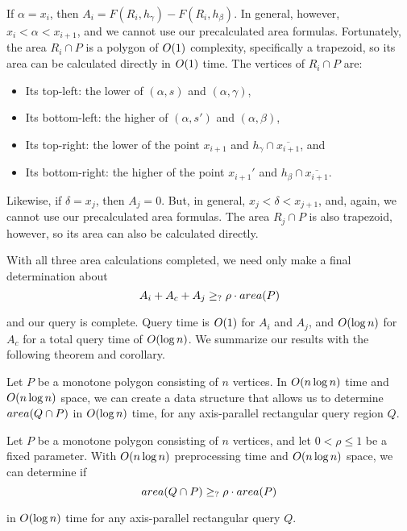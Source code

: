 If $\alpha = x_i$, then $A_i = F(R_i, h_\gamma) - F(R_i, h_\beta)$. In general, however, $x_i < \alpha < x_{i+1}$, and we cannot use our precalculated area formulas. Fortunately, the area $R_i \cap P$ is a polygon of $O\!\left(1\right)$ complexity, specifically a trapezoid, so its area can be calculated directly in $O\!\left(1\right)$ time. The vertices of $R_i \cap P$ are:
\begin{itemize}
 \item Its top-left: the lower of $(\alpha, s)$ and $(\alpha, \gamma)$,

 \item Its bottom-left: the higher of $(\alpha, s')$ and $(\alpha, \beta)$,

 \item Its top-right: the lower of the point $x_{i+1}$ and  $h_\gamma \cap \overline{x_{i+1}}$, and

 \item Its bottom-right: the higher of the point $x_{i+1}'$ and $h_\beta \cap \overline{x_{i+1}}$.

\end{itemize}

Likewise, if $\delta = x_j$, then $A_j = 0$. But, in general, $x_j < \delta < x_{j+1}$, and, again, we cannot use our precalculated area formulas. The area $R_j \cap P$ is also trapezoid, however, so its area can also be calculated directly.

With all three area calculations completed, we need only make a final determination about 
\[
A_i + A_c + A_j \geq_? \rho \cdot area(P)
\]

\noindent 
and our query is complete. Query time is $O\!\left(1\right)$ for $A_i$ and $A_j$, and $O\!\left(\log{n}\right)$ for $A_c$ for a total query time of $O\!\left(\log{n}\right)$. We summarize our results with the following theorem and corollary.

\begin{theorem}
\label{th:monotonep:rect:area}
Let $P$ be a monotone polygon consisting of $n$ vertices. In $O\!\left(n \log{n}\right)$ time and $O\!\left(n \log{n}\right)$ space, we can create a data structure that allows us to determine $area(Q \cap P)$ in $O\!\left(\log{n}\right)$ time, for any axis-parallel rectangular query region $Q$.
\end{theorem}

\begin{corollary}
\label{cor:monotonep:rect:mp}
Let $P$ be a monotone polygon consisting of $n$ vertices, and let $0 < \rho \leq 1$ be a fixed parameter. With $O\!\left(n \log{n}\right)$ preprocessing time and $O\!\left(n \log{n}\right)$ space, we can determine if
\[ 
area(Q \cap P) \geq_{?} \rho \cdot area(P) 
\] 

\noindent in $O\!\left(\log{n}\right)$ time for any axis-parallel rectangular query $Q$.
\end{corollary}


